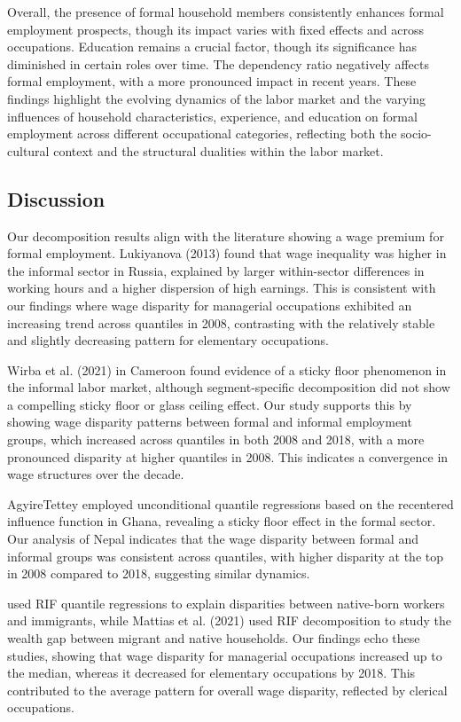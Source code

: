  
 Overall, the presence of formal household members consistently enhances formal employment prospects, though its impact varies with fixed effects and across occupations. Education remains a crucial factor, though its significance has diminished in certain roles over time. The dependency ratio negatively affects formal employment, with a more pronounced impact in recent years. These findings highlight the evolving dynamics of the labor market and the varying influences of household characteristics, experience, and education on formal employment across different occupational categories, reflecting both the socio-cultural context and the structural dualities within the labor market.
 
 \subsection{Discussion}
 
 Our decomposition results align with the literature showing a wage premium for formal employment. Lukiyanova (2013) found that wage inequality was higher in the informal sector in Russia, explained by larger within-sector differences in working hours and a higher dispersion of high earnings. This is consistent with our findings where wage disparity for managerial occupations exhibited an increasing trend across quantiles in 2008, contrasting with the relatively stable and slightly decreasing pattern for elementary occupations.
 
 Wirba et al. (2021) in Cameroon found evidence of a sticky floor phenomenon in the informal labor market, although segment-specific decomposition did not show a compelling sticky floor or glass ceiling effect. Our study supports this by showing wage disparity patterns between formal and informal employment groups, which increased across quantiles in both 2008 and 2018, with a more pronounced disparity at higher quantiles in 2008. This indicates a convergence in wage structures over the decade.
 
AgyireTettey  employed unconditional quantile regressions based on the recentered influence function in Ghana, revealing a sticky floor effect in the formal sector. Our analysis of Nepal indicates that the wage disparity between formal and informal groups was consistent across quantiles, with higher disparity at the top in 2008 compared to 2018, suggesting similar dynamics.
 
\textcite{Baum2024} used RIF quantile regressions to explain disparities between native-born workers and immigrants, while  Mattias et al. (2021) used RIF decomposition to study the wealth gap between migrant and native households. Our findings echo these studies, showing that wage disparity for managerial occupations increased up to the median, whereas it decreased for elementary occupations by 2018. This contributed to the average pattern for overall wage disparity, reflected by clerical occupations.
 
